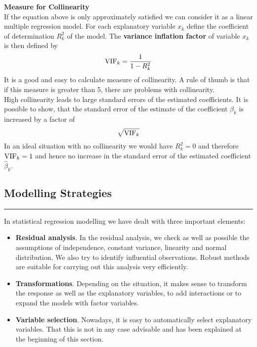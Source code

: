 \textbf{Measure for Collinearity}\\
If the equation above is only approximately satisfied we can consider it as a linear multiple regression model. For each explanatory variable $x_k$ define the coefficient of determination $R^2_k$ of the model. The \textbf{variance inflation factor} of variable $x_k$ is then defined by
\begin{equation}
  \textup{VIF}_k = \frac{1}{1-R^2_k}
\end{equation}
It is a good and easy to calculate measure of collinearity. A rule of thumb is that if this measure is greater than 5, there are problems with collinearity.\\
High collinearity leads to large standard errors of the estimated coefficients. It is possible to show, that the standard error of the estimate of the coefficient $\beta_k$ is increased by a factor of
\begin{equation}
  \sqrt{\textup{VIF}_k}
\end{equation}
In an ideal situation with no collinearity we would have $R^2_k = 0$ and therefore $\textup{VIF}_k = 1$ and hence no increase in the standard error of the estimated coefficient $\hat{\beta}_k$.

\subsection{Modelling Strategies}
\noindent\rule[\linienAbstand]{\linewidth}{\linienDicke}
In statistical regression modelling we have dealt with three important elements:
\begin{itemize}
  \item \textbf{Residual analysis}. In the residual analysis, we check as well as possible the assumptions of independence, constant variance, linearity and normal distribution. We also try to identify influential observations. Robust methods are suitable for carrying out this analysis very efficiently.
  \item \textbf{Transformations}. Depending on the situation, it makes sense to transform the response as well as the explanatory variables, to add interactions or to expand the models with factor variables.
  \item \textbf{Variable selection}. Nowadays, it is easy to automatically select explanatory variables. That this is not in any case advisable and has been explained at the beginning of this section.
\end{itemize}

